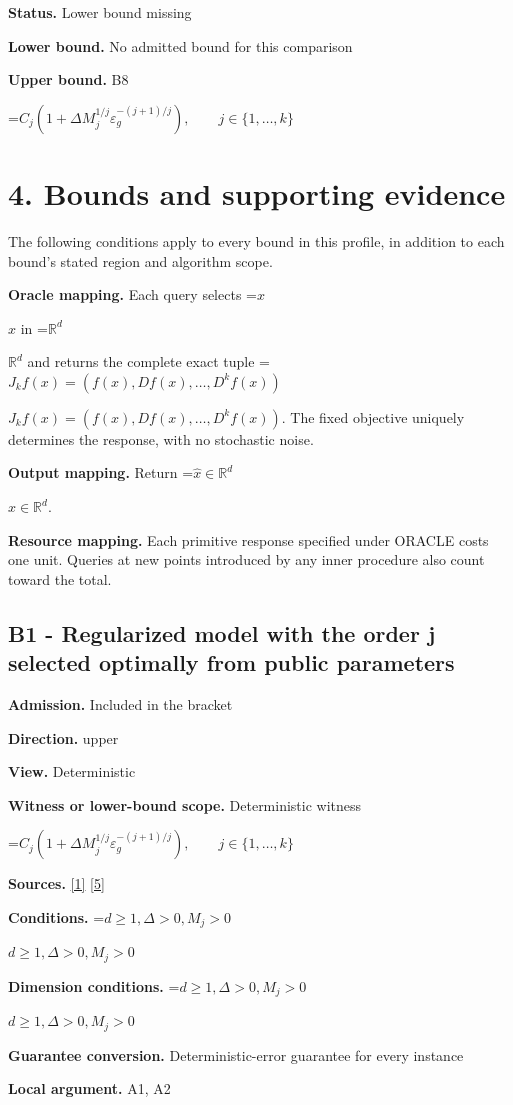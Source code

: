 \documentclass[10pt,a4paper]{article}
\newcommand{\AtlasMath}[1]{\par\begingroup\centering\setbox0=\hbox{$\displaystyle #1$}\ifdim\wd0>1.4\linewidth\typeout{ATLAS WIDE FORMULA: \the\wd0}\fi\ifdim\wd0>\linewidth\resizebox{\linewidth}{!}{\box0}\else\box0\fi\par\endgroup}
\newcommand{\AtlasInlineMath}[1]{\begingroup\setbox0=\hbox{$#1$}\ifdim\wd0>.4\linewidth\endgroup\AtlasMath{#1}\else\endgroup$#1$\fi}
\begin{document}
\textbf{Status.} Lower bound missing

\textbf{Lower bound.} No admitted bound for this comparison

\textbf{Upper bound.} B8

\AtlasMath{C_j(1+\Delta M_j^{1/j}\varepsilon_g^{-(j+1)/j}),\qquad j\in\{1,\ldots,k\}}
\section{4. Bounds and supporting evidence}
The following conditions apply to every bound in this profile, in addition to each bound's stated region and algorithm scope.

\textbf{Oracle mapping.} Each query selects \AtlasInlineMath{x} in \AtlasInlineMath{\mathbb{R}^d} and returns the complete exact tuple \AtlasInlineMath{J_{k}f(x)=(f(x),Df(x),\ldots,D^{k}f(x))}. The fixed objective uniquely determines the response, with no stochastic noise.

\textbf{Output mapping.} Return \AtlasInlineMath{\widehat{x}\in \mathbb{R}^d}.

\textbf{Resource mapping.} Each primitive response specified under ORACLE costs one unit. Queries at new points introduced by any inner procedure also count toward the total.

\subsection{B1 - Regularized model with the order j selected optimally from public parameters}
\textbf{Admission.} Included in the bracket

\textbf{Direction.} upper

\textbf{View.} Deterministic

\textbf{Witness or lower-bound scope.} Deterministic witness

\AtlasMath{C_j(1+\Delta M_j^{1/j}\varepsilon_g^{-(j+1)/j}),\qquad j\in\{1,\ldots,k\}}
\textbf{Sources.} \href{https://optimization-online.org/wp-content/uploads/2015/06/4970.pdf}{[1]} \href{https://arxiv.org/abs/1710.11606v3}{[5]}

\textbf{Conditions.} \AtlasInlineMath{d\ge 1, \Delta>0, M_j>0}

\textbf{Dimension conditions.} \AtlasInlineMath{d\ge 1, \Delta>0, M_j>0}

\textbf{Guarantee conversion.} Deterministic-error guarantee for every instance

\textbf{Local argument.} A1, A2
\end{document}
